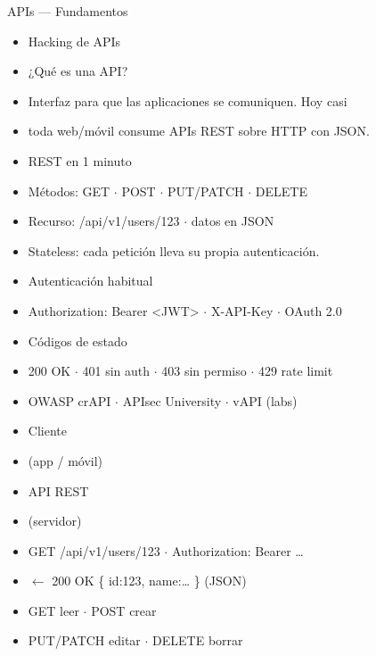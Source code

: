 \documentclass[aspectratio=169,10pt]{beamer}
\begin{document}
\begin{frame}[allowframebreaks]{APIs --- Fundamentos}
\small
  \begin{itemize}
  \item Hacking de APIs
  \item ¿Qué es una API?
  \item Interfaz para que las aplicaciones se comuniquen. Hoy casi
  \item toda web/móvil consume APIs REST sobre HTTP con JSON.
  \item REST en 1 minuto
  \item Métodos: GET $\cdot$ POST $\cdot$ PUT/PATCH $\cdot$ DELETE
  \item Recurso: /api/v1/users/123 $\cdot$ datos en JSON
  \item Stateless: cada petición lleva su propia autenticación.
  \item Autenticación habitual
  \item Authorization: Bearer \textless{}JWT\textgreater{} $\cdot$ X-API-Key $\cdot$ OAuth 2.0
  \item Códigos de estado
  \item 200 OK $\cdot$ 401 sin auth $\cdot$ 403 sin permiso $\cdot$ 429 rate limit
  \item OWASP crAPI $\cdot$ APIsec University $\cdot$ vAPI (labs)
  \item Cliente
  \item (app / móvil)
  \item API REST
  \item (servidor)
  \item GET /api/v1/users/123 $\cdot$ Authorization: Bearer \dots{}
  \item $\leftarrow$ 200 OK \{ \textquotedbl{}id\textquotedbl{}:123, \textquotedbl{}name\textquotedbl{}:\textquotedbl{}\dots{}\textquotedbl{} \} (JSON)
  \item GET leer $\cdot$ POST crear
  \item PUT/PATCH editar $\cdot$ DELETE borrar
  \end{itemize}
\end{frame}
\end{document}
